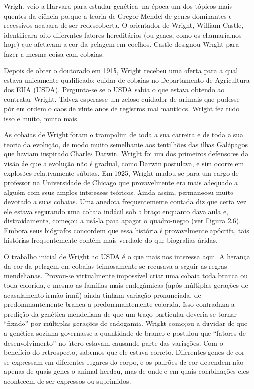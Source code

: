 \documentclass[11pt,a5paper,twoside]{book}
\begin{document}
Wright veio a Harvard para estudar genética, na época um dos tópicos mais quentes da ciência porque a teoria de Gregor Mendel de genes dominantes e recessivos acabara de ser redescoberta. O orientador de Wright, William Castle, identificara oito diferentes fatores hereditários (ou genes, como os chamaríamos hoje) que afetavam a cor da pelagem em coelhos. Castle designou Wright para fazer a mesma coisa com cobaias.

Depois de obter o doutorado em 1915, Wright recebeu uma oferta para a qual estava unicamente qualificado: cuidar de cobaias no Departamento de Agricultura dos EUA (USDA). Pergunta-se se o USDA sabia o que estava obtendo ao contratar Wright. Talvez esperasse um zeloso cuidador de animais que pudesse pôr em ordem o caos de vinte anos de registros mal mantidos. Wright fez tudo isso e muito, muito mais.

As cobaias de Wright foram o trampolim de toda a sua carreira e de toda a sua teoria da evolução, de modo muito semelhante aos tentilhões das ilhas Galápagos que haviam inspirado Charles Darwin. Wright foi um dos primeiros defensores da visão de que a evolução não é gradual, como Darwin postulava, e sim ocorre em explosões relativamente súbitas. Em 1925, Wright mudou-se para um cargo de professor na Universidade de Chicago que provavelmente era mais adequado a alguém com seus amplos interesses teóricos. Ainda assim, permaneceu muito devotado a suas cobaias. Uma anedota frequentemente contada diz que certa vez ele estava segurando uma cobaia indócil sob o braço enquanto dava aula e, distraidamente, começou a usá-la para apagar o quadro-negro (ver Figura 2.6). Embora seus biógrafos concordem que essa história é provavelmente apócrifa, tais histórias frequentemente contêm mais verdade do que biografias áridas.

O trabalho inicial de Wright no USDA é o que mais nos interessa aqui. A herança da cor da pelagem em cobaias teimosamente se recusava a seguir as regras mendelianas. Provou-se virtualmente impossível criar uma cobaia toda branca ou toda colorida, e mesmo as famílias mais endogâmicas (após múltiplas gerações de acasalamento irmão-irmã) ainda tinham variação pronunciada, de predominantemente branca a predominantemente colorida. Isso contradizia a predição da genética mendeliana de que um traço particular deveria se tornar “fixado” por múltiplas gerações de endogamia. Wright começou a duvidar de que a genética sozinha governasse a quantidade de branco e postulou que “fatores de desenvolvimento” no útero estavam causando parte das variações. Com o benefício do retrospecto, sabemos que ele estava correto. Diferentes genes de cor se expressam em diferentes lugares do corpo, e os padrões de cor dependem não apenas de quais genes o animal herdou, mas de onde e em quais combinações eles acontecem de ser expressos ou suprimidos.
\end{document}
